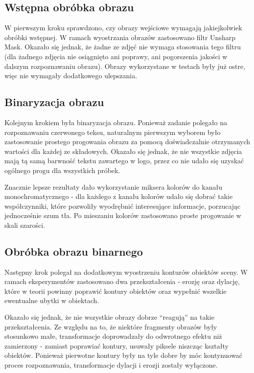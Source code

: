 \documentclass[11pt,a4paper]{article} %
\numberwithin{equation}{section} %
\numberwithin{figure}{section} %
\numberwithin{table}{section} %
\begin{document}
\subsection{Wstępna obróbka obrazu}

W pierwszym kroku sprawdzono, czy obrazy wejściowe wymagają jakiejkolwiek obróbki wstępnej. W ramach wyostrzania obrazów zastosowano filtr Unsharp Mask. Okazało się jednak, że żadne ze zdjęć nie wymaga stosowania tego filtru (dla żadnego zdjęcia nie osiągnięto ani poprawy, ani pogorszenia jakości w dalszym rozpoznawaniu obrazu). Obrazy wykorzystane w testach były już ostre, więc nie wymagały dodatkowego ulepszania.

\subsection{Binaryzacja obrazu}

Kolejnym krokiem była binaryzacja obrazu. Ponieważ zadanie polegało na rozpoznawaniu czerwonego teksu, naturalnym pierwszym wyborem było zastosowanie prostego progowania obrazu za pomocą doświadczalnie otrzymanych wartości dla każdej ze składowych. Okazało się jednak, że nie wszystkie zdjęcia mają tą samą barwność tekstu zawartego w logo, przez co nie udało się uzyskać ogólnego progu dla wszystkich próbek.

Znacznie lepsze rezultaty dało wykorzystanie miksera kolorów do kanału monochromatycznego - dla każdego z kanału kolorów udało się dobrać takie współczynniki, które pozwoliły wyodrębnić interesujące informacje, porzucając jednocześnie szum tła. Po mieszaniu kolorów zastosowano proste progowanie w skali szarości.

\subsection{Obróbka obrazu binarnego}

Następny krok polegał na dodatkowym wyostrzeniu konturów obiektów sceny. W ramach eksperymentów zastosowano dwa przekształcenia - erozję oraz dylację, które w teorii powinny poprawić kontury obiektów oraz wypełnić wszelkie ewentualne ubytki w obiektach.

Okazało się jednak, że nie wszystkie obrazy dobrze ``reagują'' na takie przekształcenia. Ze względu na to, że niektóre fragmenty obrazów były stosunkowo małe, transformacje doprowadzały do odwrotnego efektu niż zamierzony - zamiast poprawiać kontury, usuwały piksele niszcząc kształty obiektów. Ponieważ pierwotne kontury były na tyle dobre by móc kontynuować proces rozpoznawania, transformacje dylacji i erozji zostały wyłączone.
\end{document}
